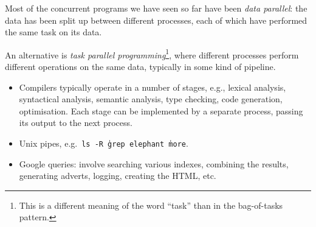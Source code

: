 \documentclass[notes,color]{sepslide0}
\begin{document}

\begin{slide}

Most of the concurrent programs we have seen so far have been \emph{data
  parallel}: the data has been split up between different processes, each of
which have performed the same task on its data.

An alternative is \emph{task parallel programming}\footnote{This is a
  different meaning of the word ``task'' than in the bag-of-tasks pattern.},
where different processes perform different operations on the same data,
typically in some kind of pipeline.

\vfill
\end{slide}


\begin{slide}

\begin{itemize}
\item
Compilers typically operate in a number of stages, e.g., lexical analysis,
syntactical analysis, semantic analysis, type checking, code generation,
optimisation.  Each stage can be implemented by a separate process, passing
its output to the next process. 

\item
Unix pipes, e.g.~\texttt{ls -R \| grep elephant \| more}.

\item 
Google queries: involve searching various indexes, combining the results,
generating adverts, logging, creating the HTML, etc.
\end{itemize}
\end{slide}





\end{document}

